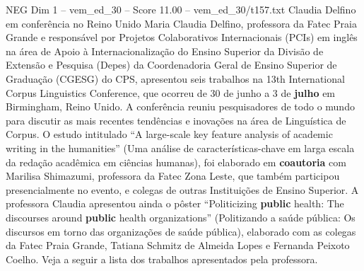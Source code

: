 \begin{textsample}{NEG Dim 1 – vem\_ed\_30 – Score 11.00 – vem\_ed\_30/t157.txt}  \label{ex:f1_neg_162}
Claudia Delfino em conferência no Reino Unido Maria Claudia Delfino, professora da Fatec Praia Grande e responsável por Projetos Colaborativos Internacionais (PCIs) em inglês na área de Apoio à Internacionalização do Ensino Superior da Divisão de Extensão e Pesquisa (Depes) da Coordenadoria Geral de Ensino Superior de Graduação (CGESG) do CPS, apresentou seis trabalhos na 13th International Corpus Linguistics Conference, que ocorreu de 30 de junho a 3 de \textbf{julho} em Birmingham, Reino Unido.
A conferência reuniu pesquisadores de todo o mundo para discutir as mais recentes tendências e inovações na área de Linguística de Corpus.
O estudo intitulado “A large-scale key feature analysis of academic writing in the humanities” (Uma análise de características-chave em larga escala da redação acadêmica em ciências humanas), foi elaborado em \textbf{coautoria} com Marilisa Shimazumi, professora da Fatec Zona Leste, que também participou presencialmente no evento, e colegas de outras Instituições de Ensino Superior.
A professora Claudia apresentou ainda o pôster “Politicizing \textbf{public} health: The discourses around \textbf{public} health organizations” (Politizando a saúde pública: Os discursos em torno das organizações de saúde pública), elaborado com as colegas da Fatec Praia Grande, Tatiana Schmitz de Almeida Lopes e Fernanda Peixoto Coelho.
Veja a seguir a lista dos trabalhos apresentados pela professora.

\end{textsample}

